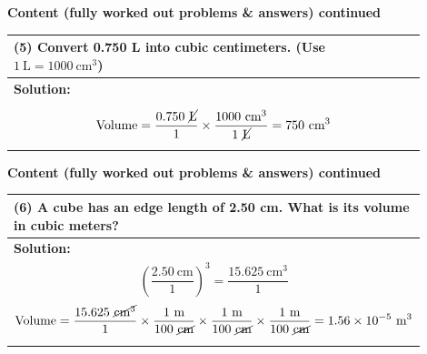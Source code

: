 \documentclass{article}
\begin{document}
\noindent
{\large \textbf{Content (fully worked out problems \& answers) continued}} \\[0.2em]
\begin{tabular}{|p{0.9\linewidth}|}
\hline
\vspace{0.2cm}

\textbf{(5)} Convert 0.750 L into cubic centimeters. (Use $1~\text{L} = 1000~\text{cm}^3$) \\
\hline
\textbf{Solution:} \\
\[
\text{Volume} = \frac{0.750~\cancel{\text{L}}}{1} \times \frac{1000~\text{cm}^3}{1~\cancel{\text{L}}} 
= 750~\text{cm}^3
\] \\
\hline
\end{tabular}
\newpage

\noindent
{\large \textbf{Content (fully worked out problems \& answers) continued}} \\[0.2em]
\begin{tabular}{|p{0.9\linewidth}|}
\hline
\vspace{0.2cm}

\textbf{(6)} A cube has an edge length of 2.50 cm. What is its volume in cubic meters? \\
\hline
\textbf{Solution:} \\
\[
\left(\frac{2.50~\text{cm}}{1}\right)^3 = \frac{15.625~\text{cm}^3}{1}
\]
\[
\text{Volume} = \frac{15.625~\cancel{\text{cm}^3}}{1} \times \frac{1~\text{m}}{100~\cancel{\text{cm}}} \times \frac{1~\text{m}}{100~\cancel{\text{cm}}} \times \frac{1~\text{m}}{100~\cancel{\text{cm}}}
= 1.56 \times 10^{-5}~\text{m}^3
\] \\
\hline
\end{tabular}
\newpage
\end{document}
